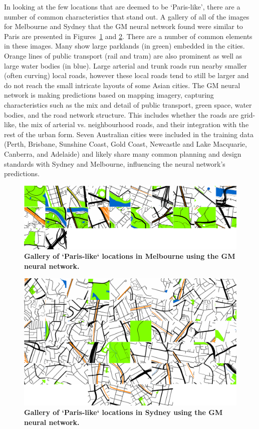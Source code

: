 \documentclass[Crown,sageh,times]{sagej}
\begin{document}
In looking at the few locations that are deemed to be `Paris-like', there are a number of common characteristics that stand out. A gallery of all of the images for Melbourne and Sydney that the GM neural network found were similar to Paris are presented in Figures~\ref{fig:gm_mel_gallery} and \ref{fig:gm_syd_gallery}. There are a number of common elements in these images. Many show large parklands (in green) embedded in the cities. Orange lines of public transport (rail and tram) are also prominent as well as large water bodies (in blue). Large arterial and trunk roads run nearby smaller (often curving) local roads, however these local roads tend to still be larger and do not reach the small intricate layouts of some Asian cities. The GM neural network is making predictions based on mapping imagery, capturing characteristics such as the mix and detail of public transport, green space, water bodies, and the road network structure. This includes whether the roads are grid-like, the mix of arterial vs. neighbourhood roads, and their integration with the rest of the urban form. Seven Australian cities were included in the training data (Perth, Brisbane, Sunshine Coast, Gold Coast, Newcastle and Lake Macquarie, Canberra, and Adelaide) and likely share many common planning and design standards with Sydney and Melbourne, influencing the neural network's predictions. 

\begin{figure}[!htbp]
\centering   
\includegraphics[scale=0.19]{Images/PlosOne/Fig10.png}   
\caption{\bf Gallery of `Paris-like` locations in Melbourne using the GM neural network.}    
 \label{fig:gm_mel_gallery} 
\end{figure} 


\begin{figure}[!htbp]
\centering   
\includegraphics[scale=0.19]{Images/PlosOne/Fig11.png}   
\caption{\bf Gallery of `Paris-like` locations in Sydney using the GM neural network.}    
 \label{fig:gm_syd_gallery}  
\end{figure} 
\end{document}

